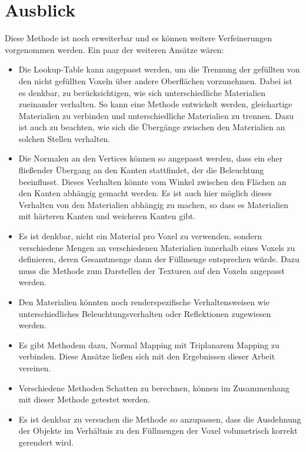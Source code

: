 
\section{Ausblick}
\label{sec:ausblick}
Diese Methode ist noch erweiterbar und es können weitere Verfeinerungen vorgenommen werden. Ein paar der weiteren Ansätze wären:
\begin{itemize}
\item Die Lookup-Table kann angepasst werden, um die Trennung der gefüllten von den nicht gefüllten Voxeln über andere Oberflächen vorzunehmen.  Dabei ist es denkbar, zu berücksichtigen, wie sich unterschiedliche Materialien zueinander verhalten. So kann eine Methode entwickelt werden, gleichartige Materialien zu verbinden und unterschiedliche Materialien zu trennen. Dazu ist auch zu beachten, wie sich die Übergänge zwischen den Materialien an solchen Stellen verhalten.
\item Die Normalen an den Vertices können  so angepasst werden, dass ein eher fließender Übergang an den Kanten stattfindet, der die Beleuchtung beeinflusst. Dieses Verhalten könnte vom Winkel zwischen den Flächen an den Kanten abhängig gemacht werden. Es ist auch hier möglich dieses Verhalten von den Materialien abhängig zu machen, so dass es Materialien mit härteren Kanten und weicheren Kanten gibt.
\item Es ist denkbar, nicht ein Material pro Voxel zu verwenden, sondern verschiedene Mengen an verschiedenen Materialien innerhalb eines Voxels zu definieren, deren Gesamtmenge dann der Füllmenge entsprechen würde. Dazu muss die Methode zum Darstellen der Texturen auf den Voxeln angepasst werden. \cite{rvmm}
\item Den Materialien könnten noch renderspezifische Verhaltensweisen wie unterschiedliches Beleuchtungsverhalten oder Reflektionen zugewiesen werden.
\item Es gibt Methodem dazu, Normal Mapping mit Triplanarem Mapping zu verbinden. Diese Ansätze ließen sich mit den Ergebnissen dieser Arbeit vereinen. \cite{nmfts}
\item Verschiedene Methoden Schatten zu berechnen, können im Zusammenhang mit dieser Methode getestet werden.
\item Es ist denkbar zu versuchen die Methode so anzupassen, dass die Ausdehnung der Objekte im Verhältnis zu den Füllmengen der Voxel volumetrisch korrekt gerendert wird.
\end{itemize}